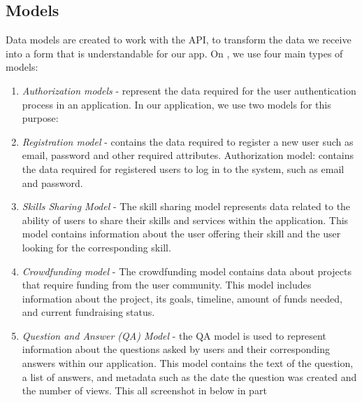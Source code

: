 \subsection{Models}\label{modls}
\hspace*{0.5cm} Data models are created to work with the API, to transform the data we receive into a form that is understandable for our app. On , we use four main types of models:
\begin{enumerate}
    \item \textit{Authorization models} - represent the data required for the user authentication process in an application. In our application, we use two models for this purpose: 
    \item \textit{Registration model} - contains the data required to register a new user such as email, password and other required attributes. Authorization model: contains the data required for registered users to log in to the system, such as email and password.
    \item \textit{Skills Sharing Model} -  The skill sharing model represents data related to the ability of users to share their skills and services within the application. This model contains information about the user offering their skill and the user looking for the corresponding skill.
    \item \textit{Crowdfunding model} - The crowdfunding model contains data about projects that require funding from the user community. This model includes information about the project, its goals, timeline, amount of funds needed, and current fundraising status.
    \item \textit{Question and Answer (QA) Model} - the QA model is used to represent information about the questions asked by users and their corresponding answers within our application. This model contains the text of the question, a list of answers, and metadata such as the date the question was created and the number of views. This all screenshot in below in  part
\end{enumerate}

